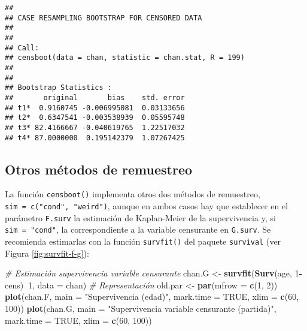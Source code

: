 \documentclass[
]{book}
\newenvironment{Shaded}{\begin{snugshade}}{\end{snugshade}}
\newcommand{\CommentTok}[1]{\textcolor[rgb]{0.56,0.35,0.01}{\textit{#1}}}
\newcommand{\DataTypeTok}[1]{\textcolor[rgb]{0.13,0.29,0.53}{#1}}
\newcommand{\DecValTok}[1]{\textcolor[rgb]{0.00,0.00,0.81}{#1}}
\newcommand{\KeywordTok}[1]{\textcolor[rgb]{0.13,0.29,0.53}{\textbf{#1}}}
\newcommand{\NormalTok}[1]{#1}
\newcommand{\OperatorTok}[1]{\textcolor[rgb]{0.81,0.36,0.00}{\textbf{#1}}}
\newcommand{\OtherTok}[1]{\textcolor[rgb]{0.56,0.35,0.01}{#1}}
\newcommand{\StringTok}[1]{\textcolor[rgb]{0.31,0.60,0.02}{#1}}
\theoremstyle{break}
\theoremstyle{definition}
\theoremstyle{definition}
\theoremstyle{definition}
\theoremstyle{remark}
\begin{document}
\begin{verbatim}
## 
## CASE RESAMPLING BOOTSTRAP FOR CENSORED DATA
## 
## 
## Call:
## censboot(data = chan, statistic = chan.stat, R = 199)
## 
## 
## Bootstrap Statistics :
##       original       bias    std. error
## t1*  0.9160745 -0.006995081  0.03133656
## t2*  0.6347541 -0.003538939  0.05595748
## t3* 82.4166667 -0.040619765  1.22517032
## t4* 87.0000000  0.195142379  1.07267425
\end{verbatim}

\hypertarget{otros-muxe9todos-de-remuestreo}{%
\subsection{Otros métodos de remuestreo}\label{otros-muxe9todos-de-remuestreo}}

La función \texttt{censboot()} implementa otros dos métodos de remuestreo,
\texttt{sim\ =\ c("cond",\ "weird")}, aunque en ambos casos hay que establecer en el
parámetro \texttt{F.surv} la estimación de Kaplan-Meier de la supervivencia y,
si \texttt{sim\ =\ "cond"}, la correspondiente a la variable censurante en \texttt{G.surv}.
Se recomienda estimarlas con la función \texttt{survfit()} del paquete \texttt{survival}
(ver Figura \ref{fig:survfit-f-g}):

\begin{Shaded}
\begin{Highlighting}[]
\CommentTok{# Estimación supervivencia variable censurante}
\NormalTok{chan.G <-}\StringTok{ }\KeywordTok{survfit}\NormalTok{(}\KeywordTok{Surv}\NormalTok{(age, }\DecValTok{1}\OperatorTok{-}\NormalTok{cens)}\OperatorTok{~}\DecValTok{1}\NormalTok{, }\DataTypeTok{data =}\NormalTok{ chan)}
\CommentTok{# Representación}
\NormalTok{old.par <-}\StringTok{ }\KeywordTok{par}\NormalTok{(}\DataTypeTok{mfrow =} \KeywordTok{c}\NormalTok{(}\DecValTok{1}\NormalTok{, }\DecValTok{2}\NormalTok{))}
\KeywordTok{plot}\NormalTok{(chan.F, }\DataTypeTok{main =} \StringTok{"Supervivencia (edad)"}\NormalTok{, }\DataTypeTok{mark.time =} \OtherTok{TRUE}\NormalTok{, }
    \DataTypeTok{xlim =} \KeywordTok{c}\NormalTok{(}\DecValTok{60}\NormalTok{, }\DecValTok{100}\NormalTok{))}
\KeywordTok{plot}\NormalTok{(chan.G, }\DataTypeTok{main =} \StringTok{"Supervivencia variable censurante (partida)"}\NormalTok{, }
     \DataTypeTok{mark.time =} \OtherTok{TRUE}\NormalTok{, }\DataTypeTok{xlim =} \KeywordTok{c}\NormalTok{(}\DecValTok{60}\NormalTok{, }\DecValTok{100}\NormalTok{))}
\end{Highlighting}
\end{Shaded}
\end{document}
